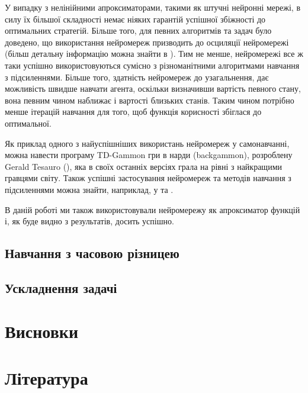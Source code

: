 \documentclass[a4paper,10pt]{article}
\begin{document}
У випадку з нелінійними апроксиматорами, такими як штучні нейронні мережі, в силу їх більшої складності немає ніяких гарантій успішної збіжності до оптимальних стратегій. Більше того, для певних алгоритмів та задач було доведено, що використання нейромереж призводить до осциляції нейромережі (більш детальну інформацію можна знайти в \cite{SuttonBarto2002}). Тим не менше, нейромережі все ж таки успішно використовуються сумісно з різноманітними алгоритмами навчання з підсиленнями. Більше того, здатність нейромереж до узагальнення, дає можливість швидше навчати агента, оскільки визначивши вартість певного стану, вона певним чином наближає і вартості близьких станів. Таким чином потрібно менше ітерацій навчання для того, щоб функція корисності збіглася до оптимальної.

Як приклад одного з найуспішніших використань нейромереж у самонавчанні, можна навести програму TD-Gammon гри в нарди (backgammon), розроблену Gerald Tesauro (\cite{Tesauro1995}), яка в своїх останніх версіях грала на рівні з найкращими гравцями світу. Також успішні застосування нейромереж та методів навчання з підсиленнями можна знайти, наприклад, у \cite{Rummery1995} та \cite{Coulom2002}.

В даній роботі ми також використовували нейромережу як апроксиматор функцій і, як буде видно з результатів, досить успішно.

\subsection{Навчання з часовою різницею}
\subsection{Ускладнення задачі}
\section{Висновки}
\section{Література}
\begin{thebibliography}{99}
\end{thebibliography}
\end{document}
